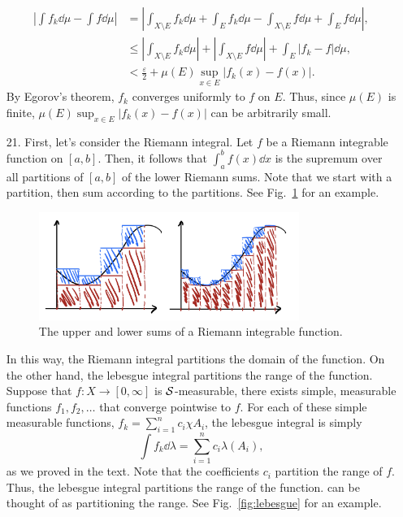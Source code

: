 \documentclass{article}
\newcommand{\eps}{\varepsilon}
\theoremstyle{remark}
\begin{document}
\begin{enumerate}[leftmargin=*]
    \begin{align*}
        \left|\int f_k \dd\mu - \int f \dd\mu\right| &= \left|\int_{X \setminus E} f_k \dd\mu + \int_{E} f_k \dd\mu - \int_{X \setminus E} f \dd\mu + \int_E f \dd\mu \right|, \\
        &\leq \left|\int_{X \setminus E} f_k \dd\mu\right| + \left|\int_{X\setminus E} f\dd\mu \right| + \int_E |f_k - f| \dd\mu, \\
        &< \frac{\eps}{2} + \mu(E) \sup_{x \in E} |f_k(x) - f(x)|.
    \end{align*}
    By Egorov's theorem, $f_k$ converges uniformly to $f$ on $E$. Thus, since $\mu(E)$ is finite, $\mu(E) \sup_{x\in E} |f_k(x) - f(x)|$ can be arbitrarily small.
    \item[21.] First, let's consider the Riemann integral. Let $f$ be a Riemann integrable function on $[a,b]$.
    Then, it follows that $\int_a^b f(x) \dd x$ is the supremum over all partitions of $[a,b]$ of the lower Riemann sums.
    Note that we start with a partition, then sum according to the partitions. See Fig.~\ref{fig:riemann} for an example.
    \begin{figure}
        \centering
        \includegraphics[width=0.8\textwidth]{riemann.jpeg}
        \caption{The upper and lower sums of a Riemann integrable function.}
        \label{fig:riemann}
    \end{figure}
    In this way, the Riemann integral partitions the domain of the function. On the other hand, the lebesgue integral partitions the range of the function.
    Suppose that $f: X \to [0,\infty]$ is $\mathcal{S}$-measurable, there exists simple, measurable functions $f_1, f_2,\ldots$ that 
    converge pointwise to $f$. For each of these simple measurable functions, $f_k = \sum_{i=1}^n c_i\chi{A_i}$,
    the lebesgue integral is simply
    \[
        \int f_k \dd\lambda = \sum_{i=1}^n c_i \lambda(A_i),
    \]
    as we proved in the text. Note that the coefficients $c_i$ partition the range of $f$. Thus, the lebesgue integral partitions the range of the function.
    can be thought of as partitioning the range. See Fig.~\ref{fig:lebesgue} for an example.

\end{enumerate}
\end{document}
